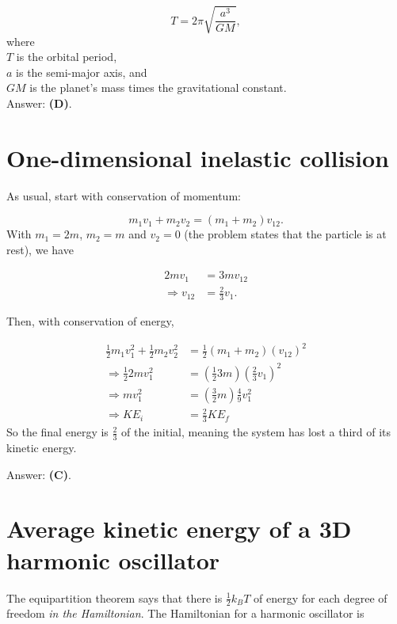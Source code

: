 \documentclass[11pt]{paper}
\newcommand{\answer}[1]{Answer: \textbf{(#1)}.}
\begin{document}
\begin{equation}
T = 2\pi \sqrt{\frac{a^3}{GM}},
\end{equation}
where\\
$T$ is the orbital period,\\
$a$ is the semi-major axis, and\\
$GM$ is the planet's mass times the gravitational constant.\\

\answer{D}

\section{One-dimensional inelastic collision}
As usual, start with conservation of momentum:

\begin{equation}
m_1 v_1 + m_2 v_2 = (m_1 + m_2) v_{12}.
\end{equation}
With $m_1 = 2m$, $m_2 = m$ and $v_2 = 0$ (the problem states that the particle is at rest), we have

\begin{align}
2m v_1 &= 3m v_{12}\\
\Rightarrow v_{12} &= \frac{2}{3} v_1.
\end{align}

Then, with conservation of energy,

\begin{align}
\frac{1}{2} m_1 v_1^2 + \frac{1}{2} m_2 v_2^2 &= \frac{1}{2} \left(m_1 + m_2\right) (v_{12})^2\\
\Rightarrow \frac{1}{2} 2 m v_1^2  &= \left(\frac{1}{2} 3 m\right) \left(\frac{2}{3} v_1\right)^2\\
\Rightarrow m v_1^2 &= \left(\frac{3}{2}m\right) \frac{4}{9} v_1^2\\
\Rightarrow KE_i &= \frac{2}{3} KE_f
\end{align}
So the final energy is $\frac{2}{3}$ of the initial, meaning the system has lost a third of its kinetic energy.

\answer{C}

\section{Average kinetic energy of a 3D harmonic oscillator}
The equipartition theorem says that there is $\frac{1}{2}k_B T$ of energy for each degree of freedom \emph{in the Hamiltonian}.  The Hamiltonian for a harmonic oscillator is 
\end{document}
